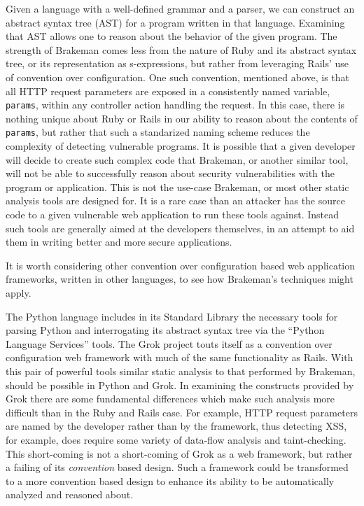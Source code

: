\documentclass[conference]{IEEEtran}
\begin{document}
Given a language with a well-defined grammar and a parser, we can construct an
abstract syntax tree (AST) for a program written in that language.  Examining
that AST allows one to reason about the behavior of the given program.  The
strength of Brakeman comes less from the nature of Ruby and its abstract syntax
tree, or its representation as s-expressions, but rather from leveraging Rails'
use of convention over configuration.  One such convention, mentioned above, is
that all HTTP request parameters are exposed in a consistently named variable,
\texttt{params}, within any controller action handling the request.  In this case,
there is nothing unique about Ruby or Rails in our ability to reason about the
contents of \texttt{params}, but rather that such a standarized naming scheme
reduces the complexity of detecting vulnerable programs.  It is possible that a
given developer will decide to create such complex code that Brakeman, or
another similar tool, will not be able to successfully reason about security
vulnerabilities with the program or application.  This is not the use-case
Brakeman, or most other static analysis tools are designed for.  It is a rare
case than an attacker has the source code to a given vulnerable web application
to run these tools against.  Instead such tools are generally aimed at the
developers themselves, in an attempt to aid them in writing better and more
secure applications.

It is worth considering other convention over configuration based web
application frameworks, written in other languages, to see how Brakeman's
techniques might apply.

The Python language includes in its Standard Library the necessary tools for
parsing Python and interrogating its abstract syntax tree via the ``Python
Language Services''\cite{python_language_services} tools.  The Grok\cite{grok}
project touts itself as a convention over configuration web framework with much
of the same functionality as Rails.  With this pair of powerful tools similar
static analysis to that performed by Brakeman, should be possible in Python and
Grok.  In examining the constructs provided by Grok there are some fundamental
differences which make such analysis more difficult than in the Ruby and Rails
case.  For example, HTTP request parameters are named by the developer rather
than by the framework, thus detecting XSS, for example, does require some variety
of data-flow analysis and taint-checking.  This short-coming is not a
short-coming of Grok as a web framework, but rather a failing of its
\emph{convention} based design.  Such a framework could be transformed to a more
convention based design to enhance its ability to be automatically analyzed and
reasoned about.
\end{document}
